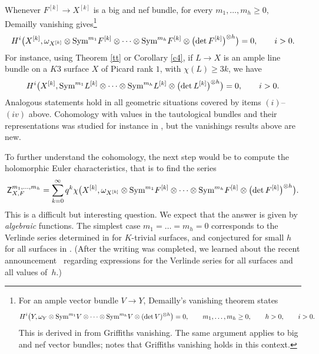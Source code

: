 \documentclass[pdftex]{sigma}
\numberwithin{equation}{section}
\newcommand{\sym}{\textnormal{Sym}}
\begin{document}
Whenever $F^{[k]}\to X^{[k]}$ is a big and nef bundle, for every $m_1, \dots, m_h\geq 0$, Demailly vanishing gives\footnote{For an ample vector bundle $V\to Y$, Demailly's vanishing theorem \cite{De} states
\begin{gather*}
H^i\big(Y, \omega_Y\otimes \sym^{m_1}V\otimes \dots \otimes \sym^{m_h}V\otimes (\det V)^{\otimes h}\big)=0, \qquad m_1, \dots, m_h\geq 0, \qquad h>0, \qquad i> 0.
\end{gather*}
This is derived in \cite[Theorem 7.3.14]{L-II} from Griffiths vanishing. The same argument applies to big and nef vector bundles; \cite[Example 7.3.3]{L-II} notes that Griffiths vanishing holds in this context.}
\begin{gather*}
H^i\bigl(X^{[k]}, \omega_{X^{[k]}} \otimes \sym^{m_1}F^{[k]}\otimes \dots \otimes \sym^{m_h} F^{[k]}\otimes \bigl(\det F^{[k]}\bigr)^{\otimes h}\bigr)=0, \qquad i>0.
\end{gather*}
For instance, using Theorem \ref{tt} or Corollary \ref{c4}, if $L\to X$ is an ample line bundle on a $K3$ surface $X$ of Picard rank $1$, with $\chi(L)\geq 3k$, we have
\begin{gather*}
H^i\bigl(X^{[k]}, \sym^{m_1}L^{[k]}\otimes \dots \otimes \sym^{m_h} L^{[k]}\otimes \bigl(\det L^{[k]}\bigr)^{\otimes h}\bigr)=0, \qquad i>0.
\end{gather*}
Analogous statements hold in all geometric situations covered by items $(i)$--$(iv)$ above. Cohomology with values in the tautological bundles and their representations was studied for instance in \cite{A, Da, EGL, Sc, Z}, but the vanishings results above are new.

To further understand the cohomology, the next step would be to compute the holomorphic Euler characteristics, that is to find the series
 \begin{gather*}
 \mathsf Z_{X, F}^{m_1, \dots, m_h}=\sum_{k=0}^{\infty} q^k \chi \bigl(X^{[k]}, \omega_{X^{[k]}} \otimes \sym^{m_1}F^{[k]}\otimes \dots \otimes \sym^{m_h} F^{[k]}\otimes \bigl(\det F^{[k]}\bigr)^{\otimes h}\bigr).
 \end{gather*}
This is a difficult but interesting question. We expect that the answer is given by {\it algebraic} functions. The simplest case $m_1=\dots=m_h=0$ corresponds to the Verlinde series determined in \cite[Theorem~5.3]{EGL} for $K$-trivial surfaces, and conjectured for small $h$ for all surfaces in \cite[Section 1.6]{MOP}. (After the writing was completed, we learned about the recent announcement~\cite{G} regarding expressions for the Verlinde series for all surfaces and all values of~$h$.)
\end{document}
